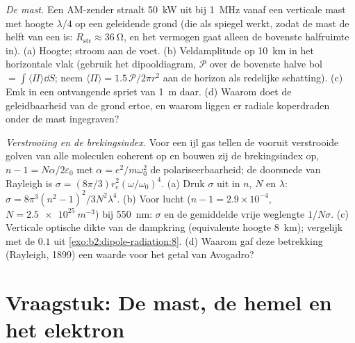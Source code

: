 \begin{exercise}[$\star\star\star$]\label{exo:b2:dipole-radiation:11}
\emph{De mast.} Een AM-zender straalt \qty{50}{kW} uit bij \qty{1}{MHz}
vanaf een verticale mast met hoogte $\lambda/4$ op een geleidende grond (die
als spiegel werkt, zodat de mast de helft van een  is:
$R_{\text{str}} \approx
\qty{36}{\ohm}$, en het vermogen gaat alleen de
bovenste halfruimte in). (a) Hoogte; stroom aan de voet. (b) Veldamplitude
op \qty{10}{km} in het horizontale vlak (gebruik het dipooldiagram,
$\mathcal P$ over de bovenste halve bol $= \int\langle\Pi\rangle\dd S$; neem
$\langle\Pi\rangle = 1.5\,
\mathcal P/2\pi r^2$ aan de horizon als redelijke
schatting). (c) Emk in een ontvangende spriet van \qty{1}{m} daar. (d)
Waarom doet de geleidbaarheid van de grond ertoe, en waarom liggen er
radiale koperdraden onder de mast ingegraven?
\end{exercise}

\begin{exercise}[$\star\star\star$]\label{exo:b2:dipole-radiation:12}
\emph{Verstrooiing en de brekingsindex.} Voor een ijl gas tellen de vooruit
verstrooide golven van alle moleculen coherent op en bouwen zij de
brekingsindex op, $n - 1 = N\alpha/2\varepsilon_0$ met
$\alpha = e^2/m\omega_0^2$ de polariseerbaarheid; de doorsnede van Rayleigh
is $\sigma = (8\pi/3)r_e^2(\omega/\omega_0)^4$. (a) Druk $\sigma$ uit in
$n$, $N$ en $\lambda$: $\sigma = 8\pi^3(n^2 - 1)^2/3N^2\lambda^4$. (b) Voor
lucht ($n - 1 = 2.9 \times 10^{-4}$, $N = \qty{2.5e25}{m^{-3}}$) bij
\qty{550}{nm}: $\sigma$ en de gemiddelde vrije weglengte $1/N\sigma$. (c)
Verticale optische dikte van de dampkring (equivalente hoogte \qty{8}{km});
vergelijk met de $0.1$ uit \cref{exo:b2:dipole-radiation:8}. (d) Waarom gaf
deze betrekking (Rayleigh, 1899) een waarde voor het getal van Avogadro?
\end{exercise}

\section{Vraagstuk: De mast, de hemel en het elektron}

